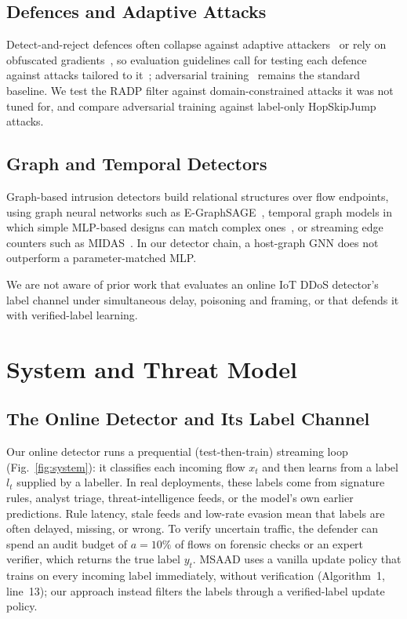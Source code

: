 \documentclass[conference]{IEEEtran}
\begin{document}
\subsection{Defences and Adaptive Attacks}
Detect-and-reject defences often collapse against adaptive
attackers~\cite{tramer2020adaptive} or rely on obfuscated
gradients~\cite{athalye2018obfuscated}, so evaluation guidelines call for
testing each defence against attacks tailored to it~\cite{carlini2019evaluating};
adversarial training~\cite{madry2018pgd} remains the standard baseline. We test
the RADP filter against domain-constrained attacks it was not tuned for, and
compare adversarial training against label-only HopSkipJump attacks.

\subsection{Graph and Temporal Detectors}
Graph-based intrusion detectors build relational structures over flow
endpoints, using graph neural networks such as
E-GraphSAGE~\cite{lo2022egraphsage}, temporal graph models in which simple
MLP-based designs can match complex ones~\cite{cong2023graphmixer}, or streaming
edge counters such as MIDAS~\cite{bhatia2020midas}. In our detector chain, a
host-graph GNN does not outperform a parameter-matched MLP.

We are not aware of prior work that evaluates an online IoT DDoS detector's
label channel under simultaneous delay, poisoning and framing, or that defends
it with verified-label learning.

\section{System and Threat Model}\label{sec:threat}

\subsection{The Online Detector and Its Label Channel}
Our online detector runs a prequential (test-then-train) streaming loop
(Fig.~\ref{fig:system}): it classifies each incoming flow $x_t$ and then learns
from a label $l_t$ supplied by a labeller. In real deployments, these labels
come from signature rules, analyst triage, threat-intelligence feeds, or the
model's own earlier predictions. Rule latency, stale feeds and low-rate evasion
mean that labels are often delayed, missing, or wrong. To verify uncertain
traffic, the defender can spend an audit budget of $a = 10\%$ of flows on
forensic checks or an expert verifier, which returns the true label $y_t$.
MSAAD uses a vanilla update policy that trains on every incoming label
immediately, without verification (Algorithm~1, line~13); our approach instead
filters the labels through a verified-label update policy.
\end{document}
